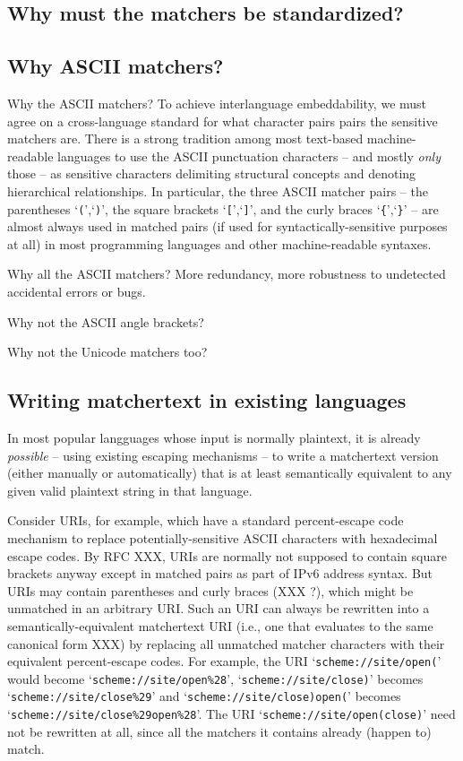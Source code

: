 \subsection{Why must the matchers be standardized?}



\subsection{Why ASCII matchers?}
\label{sec:design:ascii}

Why the ASCII matchers?
To achieve interlanguage embeddability,
we must agree on a cross-language standard for what character pairs
pairs the sensitive matchers are.
There is a strong tradition among most text-based machine-readable languages
to use the ASCII punctuation characters -- and mostly \emph{only} those --
as sensitive characters delimiting structural concepts
and denoting hierarchical relationships.
In particular, the three ASCII matcher pairs --
the parentheses `\verb|(|',`\verb|)|',
the square brackets `\verb|[|',`\verb|]|',
and the curly braces `\verb|{|',`\verb|}|' --
are almost always used in matched pairs
(if used for syntactically-sensitive purposes at all)
in most programming languages and other machine-readable syntaxes.


Why all the ASCII matchers?  More redundancy, more robustness
to undetected accidental errors or bugs.

Why not the ASCII angle brackets?

Why not the Unicode matchers too?


\subsection{Writing matchertext in existing languages}

In most popular langguages whose input is normally plaintext,
it is already \emph{possible} -- using existing escaping mechanisms --
to write a matchertext version
(either manually or automatically)
that is at least semantically equivalent
to any given valid plaintext string in that language.

Consider URIs, for example,
which have a standard percent-escape code mechanism
to replace potentially-sensitive ASCII characters with hexadecimal escape codes.
By RFC XXX, URIs are normally not supposed to contain square brackets anyway
except in matched pairs as part of IPv6 address syntax.
But URIs may contain parentheses and curly braces (XXX ?),
which might be unmatched in an arbitrary URI.
Such an URI can always be rewritten
into a semantically-equivalent matchertext URI
(i.e., one that evaluates to the same canonical form XXX)
by replacing all unmatched matcher characters with their
equivalent percent-escape codes.
For example, the URI `\verb|scheme://site/open(|'
would become `\verb|scheme://site/open%28|',
`\verb|scheme://site/close)|'
becomes `\verb|scheme://site/close%29|'
and `\verb|scheme://site/close)open(|' becomes
`\verb|scheme://site/close%29open%28|'.
The URI `\verb|scheme://site/open(close)|'
need not be rewritten at all,
since all the matchers it contains already (happen to) match.

